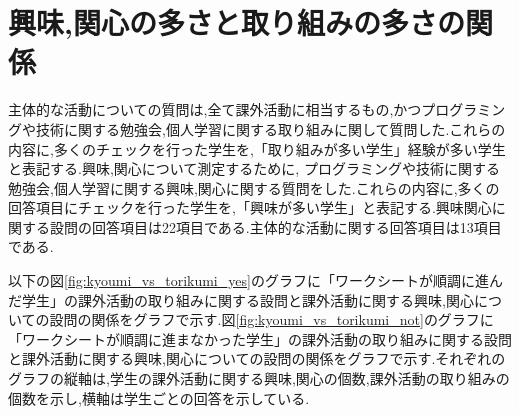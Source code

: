 \documentclass[11pt, a4paper]{jreport}
\begin{document}
\section{興味,関心の多さと取り組みの多さの関係}

主体的な活動についての質問は,全て課外活動に相当するもの,かつプログラミングや技術に関する勉強会,個人学習に関する取り組みに関して質問した.これらの内容に,多くのチェックを行った学生を,「取り組みが多い学生」経験が多い学生と表記する.興味,関心について測定するために, プログラミングや技術に関する勉強会,個人学習に関する興味,関心に関する質問をした.これらの内容に,多くの回答項目にチェックを行った学生を,「興味が多い学生」と表記する.興味関心に関する設問の回答項目は22項目である.主体的な活動に関する回答項目は13項目である.

以下の図\ref{fig:kyoumi_vs_torikumi_yes}のグラフに「ワークシートが順調に進んだ学生」の課外活動の取り組みに関する設問と課外活動に関する興味,関心についての設問の関係をグラフで示す.図\ref{fig:kyoumi_vs_torikumi_not}のグラフに「ワークシートが順調に進まなかった学生」の課外活動の取り組みに関する設問と課外活動に関する興味,関心についての設問の関係をグラフで示す.それぞれのグラフの縦軸は,学生の課外活動に関する興味,関心の個数,課外活動の取り組みの個数を示し,横軸は学生ごとの回答を示している.
\end{document}
